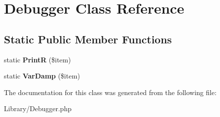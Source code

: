 \hypertarget{class_debugger}{\section{Debugger Class Reference}
\label{class_debugger}
}
\subsection*{Static Public Member Functions}
\begin{DoxyCompactItemize}
\item 
\hypertarget{class_debugger_aabc92ba8fe7187ce953d8edbb3175e78}{static {\bfseries Print\-R} (\$item)}\label{class_debugger_aabc92ba8fe7187ce953d8edbb3175e78}

\item 
\hypertarget{class_debugger_a54d5010505863da589f9355a898c4116}{static {\bfseries Var\-Damp} (\$item)}\label{class_debugger_a54d5010505863da589f9355a898c4116}

\end{DoxyCompactItemize}


The documentation for this class was generated from the following file\-:\begin{DoxyCompactItemize}
\item 
Library/Debugger.\-php\end{DoxyCompactItemize}

